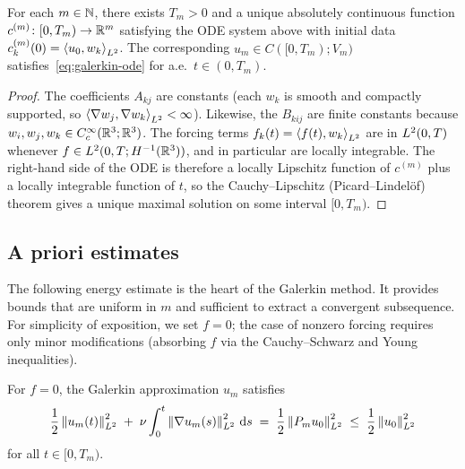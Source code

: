 \begin{proposition}%
  \label{prop:galerkin-local}
  For each $m \in \mathbb{N}$, there exists $T_{m} > 0$ and a unique absolutely continuous
  function $c^{(m)} \colon [0, T_{m}) \to \mathbb{R}^{m}$ satisfying the ODE system above with
  initial data $c_{k}^{(m)}(0) = \left\langle u_{0}, w_{k} \right\rangle_{L^{2}}$.  The corresponding
  $u_{m} \in C([0, T_{m}); V_{m})$ satisfies~\eqref{eq:galerkin-ode} for a.e.\
  $t \in (0, T_{m})$.
\end{proposition}

\begin{proof}
  The coefficients $A_{kj}$ are constants (each $w_{k}$ is smooth and compactly
  supported, so $\left\langle \nabla w_{j}, \nabla w_{k} \right\rangle_{L^{2}} < \infty$).  Likewise, the
  $B_{kij}$ are finite constants because
  $w_{i}, w_{j}, w_{k} \in C^\infty_c(\mathbb{R}^{3}; \mathbb{R}^{3})$.
  The forcing terms $f_{k}(t) = \left\langle f(t), w_{k} \right\rangle_{L^{2}}$ are in
  $L^{2}(0, T)$ whenever $f \in L^{2}(0, T; H^{-1}(\mathbb{R}^{3}))$, and in
  particular are locally integrable.  The right-hand side of the ODE is therefore
  a locally Lipschitz function of $c^{(m)}$ plus a locally integrable function of
  $t$, so the Cauchy--Lipschitz (Picard--Lindel\"{o}f) theorem gives a unique
  maximal solution on some interval $[0, T_{m})$.
\end{proof}

\subsection{A priori estimates}\label{subsec:a-priori}

The following energy estimate is the heart of the Galerkin method.  It provides
bounds that are uniform in $m$ and sufficient to extract a convergent subsequence.
For simplicity of exposition, we set $f = 0$; the case of nonzero forcing requires
only minor modifications (absorbing $f$ via the Cauchy--Schwarz and Young
inequalities).

\begin{theorem}%
  \label{thm:galerkin-energy}
  For $f = 0$, the Galerkin approximation $u_{m}$ satisfies
  \begin{equation}\label{eq:galerkin-energy-estimate}
    \frac{1}{2}\left\lVert u_{m}(t) \right\rVert_{L^{2}}^{2}
    \;+\;
    \nu \int_{0}^{t} \left\lVert \nabla u_{m}(s) \right\rVert_{L^{2}}^{2} \,\mathrm{d} s
    \;=\;
    \frac{1}{2}\left\lVert P_{m} u_{0} \right\rVert_{L^{2}}^{2}
    \;\le\;
    \frac{1}{2}\left\lVert u_{0} \right\rVert_{L^{2}}^{2}
  \end{equation}
  for all $t \in [0, T_{m})$.
\end{theorem}

